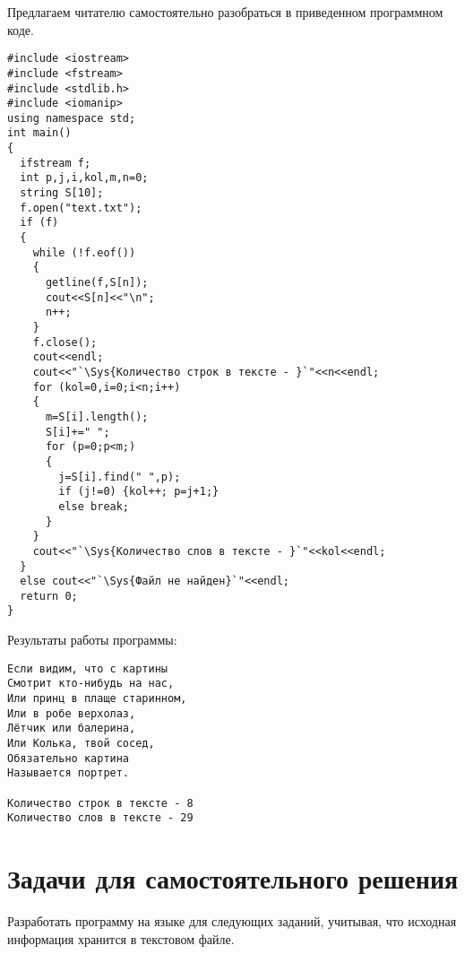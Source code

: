 
Предлагаем читателю самостоятельно разобраться в приведенном программном коде. 
\begin{lstlisting}
#include <iostream>
#include <fstream>
#include <stdlib.h>
#include <iomanip>
using namespace std;
int main()
{
  ifstream f;
  int p,j,i,kol,m,n=0;
  string S[10];
  f.open("text.txt");
  if (f)
  {
    while (!f.eof())
    {
      getline(f,S[n]);
      cout<<S[n]<<"\n";
      n++;
    }
    f.close();
    cout<<endl;
    cout<<"`\Sys{Количество строк в тексте - }`"<<n<<endl;
    for (kol=0,i=0;i<n;i++)
    {
      m=S[i].length();
      S[i]+=" ";
      for (p=0;p<m;)
      {
        j=S[i].find(" ",p);
        if (j!=0) {kol++; p=j+1;}
        else break;
      }
    }
    cout<<"`\Sys{Количество слов в тексте - }`"<<kol<<endl;
  }
  else cout<<"`\Sys{Файл не найден}`"<<endl;
  return 0;
}
\end{lstlisting}
Результаты работы программы:
\begin{verbatim}
Если видим, что с картины
Смотрит кто-нибудь на нас,
Или принц в плаще старинном,
Или в робе верхолаз,
Лётчик или балерина,
Или Колька, твой сосед,
Обязательно картина
Называется портрет.

Количество строк в тексте - 8
Количество слов в тексте - 29
\end{verbatim}

\section[Задачи для самостоятельного решения]{Задачи для самостоятельного решения}
Разработать программу на языке  для следующих заданий, учитывая, что исходная информация хранится в текстовом файле.

